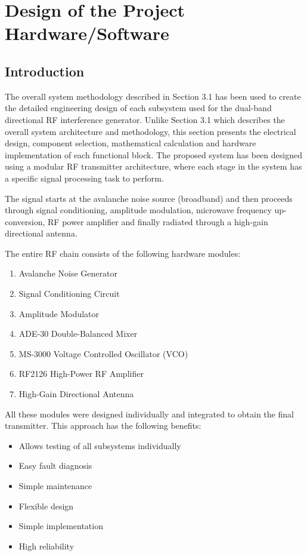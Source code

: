 \documentclass[12pt,a4paper]{report}
\begin{document}
	\section{Design of the Project Hardware/Software }
	
	\subsection{Introduction}
	The overall system methodology described in Section 3.1 has been used to create the detailed engineering design of each subsystem used for the dual-band directional RF interference generator. Unlike Section 3.1 which describes the overall system architecture and methodology, this section presents the electrical design, component selection, mathematical calculation and hardware implementation of each functional block. The proposed system has been designed using a modular RF transmitter architecture, where each stage in the system has a specific signal processing task to perform.
	
	The signal starts at the avalanche noise source (broadband) and then proceeds through signal conditioning, amplitude modulation, microwave frequency up-conversion, RF power amplifier and finally radiated through a high-gain directional antenna.
	
	The entire RF chain consists of the following hardware modules:
	\begin{enumerate}
		\item Avalanche Noise Generator
		\item Signal Conditioning Circuit
		\item Amplitude Modulator
		\item ADE-30 Double-Balanced Mixer
		\item MS-3000 Voltage Controlled Oscillator (VCO)
		\item RF2126 High-Power RF Amplifier
		\item High-Gain Directional Antenna
	\end{enumerate}
	
	All these modules were designed individually and integrated to obtain the final transmitter. This approach has the following benefits:
	\begin{itemize}
		\item Allows testing of all subsystems individually
		\item Easy fault diagnosis
		\item Simple maintenance
		\item Flexible design
		\item Simple implementation
		\item High reliability
	\end{itemize}
	
\end{document}
